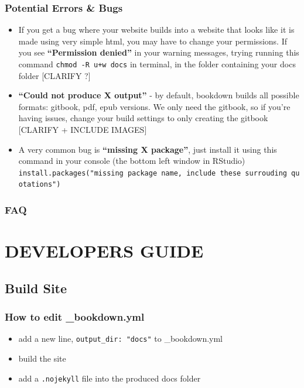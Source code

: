 \documentclass[
]{book}
\providecommand{\tightlist}{%
  \setlength{\itemsep}{0pt}\setlength{\parskip}{0pt}}
\theoremstyle{definition}
\theoremstyle{definition}
\theoremstyle{definition}
\theoremstyle{definition}
\theoremstyle{remark}
\begin{document}
\section{Potential Errors \& Bugs}\label{potential-errors-bugs}

\begin{itemize}
\item
  If you get a bug where your website builds into a website that looks like it is made using very simple html, you may have to change your permissions. If you see \textbf{``Permission denied''} in your warning messages, trying running this command \texttt{chmod\ -R\ u+w\ docs} in terminal, in the folder containing your docs folder {[}CLARIFY ?{]}
\item
  \textbf{``Could not produce X output''} - by default, bookdown builds all possible formats: gitbook, pdf, epub versions. We only need the gitbook, so if you're having issues, change your build settings to only creating the gitbook {[}CLARIFY + INCLUDE IMAGES{]}
\item
  A very common bug is \textbf{``missing X package''}, just install it using this command in your console (the bottom left window in RStudio) \texttt{install.packages("missing\ package\ name,\ include\ these\ surrouding\ quotations")}
\end{itemize}

\section{FAQ}\label{faq}

\part{DEVELOPERS GUIDE}\label{part-developers-guide}

\chapter{Build Site}\label{build-site}

\section{How to edit \_bookdown.yml}\label{how-to-edit-_bookdown.yml}

\begin{itemize}
\tightlist
\item
  add a new line, \texttt{output\_dir:\ "docs"} to \_bookdown.yml
\item
  build the site
\item
  add a \texttt{.nojekyll} file into the produced docs folder
\end{itemize}
\end{document}
